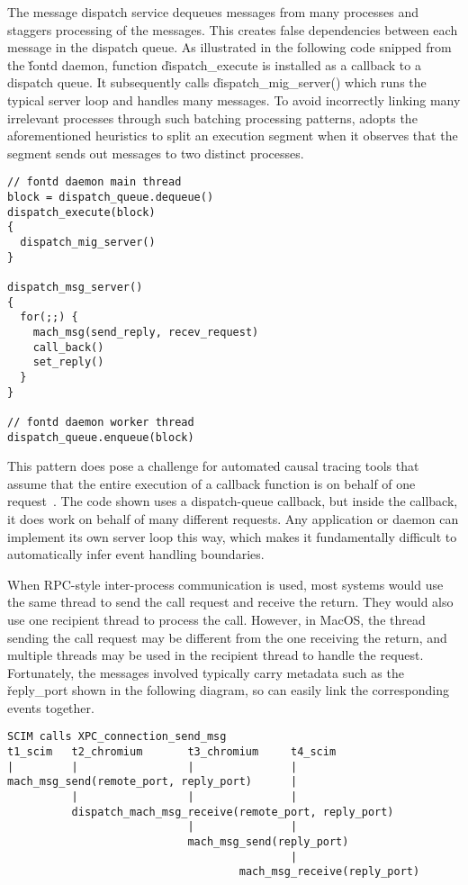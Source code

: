  The message dispatch service dequeues
messages from many processes and staggers processing of the messages. This
creates false dependencies between each message in the dispatch queue.  As
illustrated in the following code snipped from the \v{fontd} daemon,
function \v{dispatch\_execute} is installed as a callback to a dispatch
queue.  It subsequently calls \v{dispatch\_mig\_server()} which runs the
typical server loop and handles many messages.  To avoid incorrectly
linking many irrelevant processes through such batching processing
patterns, \xxx adopts the aforementioned heuristics to split an execution
segment when it observes that the segment sends out messages to two
distinct processes.

{\footnotesize \begin{verbatim}
// fontd daemon main thread
block = dispatch_queue.dequeue()
dispatch_execute(block)
{
  dispatch_mig_server()
}

dispatch_msg_server()
{
  for(;;) {
    mach_msg(send_reply, recev_request)
    call_back()
    set_reply()
  }
}

// fontd daemon worker thread
dispatch_queue.enqueue(block)
\end{verbatim}
}

This pattern does pose a challenge for automated causal tracing tools that
assume that the entire execution of a callback function is on behalf of
one request~\cite{xxx}.  The code shown uses a dispatch-queue callback,
but inside the callback, it does work on behalf of many different
requests.  Any application or daemon can implement its  own server loop
this way, which makes it fundamentally difficult to automatically infer
event handling boundaries.

When RPC-style inter-process communication is used, most systems would use
the same thread to send the call request and receive the return.  They
would also use one recipient thread to process the call.  However, in
MacOS, the thread sending the call request may be different from the one
receiving the return, and multiple threads may be used in the recipient
thread to handle the request.  Fortunately, the messages involved
typically carry metadata such as the \v{reply\_port} shown in the
following diagram, so \xxx can easily link the corresponding events
together.

{\footnotesize \begin{verbatim}
SCIM calls XPC_connection_send_msg
t1_scim   t2_chromium       t3_chromium     t4_scim
|         |                 |               |
mach_msg_send(remote_port, reply_port)      |
          |                 |               |
          dispatch_mach_msg_receive(remote_port, reply_port)
                            |               |
                            mach_msg_send(reply_port)
                                            |
                                    mach_msg_receive(reply_port)
\end{verbatim}
}

